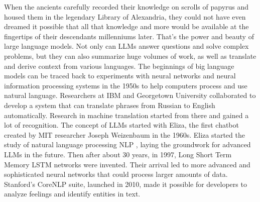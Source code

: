 When the ancients carefully recorded their knowledge on scrolls of papyrus and housed them in the legendary Library of Alexandria, they could not have even dreamed it possible that all that knowledge and more would be available at the fingertips of their descendants millenniums later. That’s the power and beauty of large language models. Not only can LLMs answer questions and solve complex problems, but they can also summarize huge volumes of work, as well as translate and derive context from various languages.
\vskip 0.5cm
The beginnings of big language models can be traced back to experiments with neural networks and neural information processing systems in the 1950s to help computers process and use natural language. Researchers at IBM and Georgetown University collaborated to develop a system that can translate phrases from Russian to English automatically. Research in machine translation started from there and gained a lot of recognition.
\vskip 0.5cm
The concept of LLMs started with Eliza, the first chatbot created by MIT researcher Joseph Weizenbaum in the 1960s. Eliza started the study of natural language processing NLP , laying the groundwork for advanced LLMs in the future. Then after about 30 years, in 1997, Long Short Term Memory LSTM networks were invented. Their arrival led to more advanced and sophisticated neural networks that could process larger amounts of data. Stanford's CoreNLP suite, launched in 2010, made it possible for developers to analyze feelings and identify entities in text.
\vskip 0.5cm

